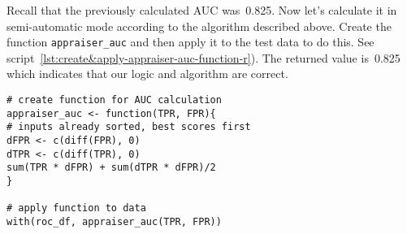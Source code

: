 \documentclass[]{scrreprt}
\begin{document}
Recall that the previously calculated AUC was~0.825. Now let's calculate it in semi-automatic mode according to the algorithm described above. Create the function \texttt{appraiser\_auc} and then apply it to the test data to do this. See script~\ref{lst:create&apply-appraiser-auc-function-r}). The returned value is~0.825 which indicates that our logic and algorithm are correct.
%
\begin{lstlisting}[float=htp, caption = Creating a function to calculate AUC in semi-automatic mode and applying it to test data, firstnumber=1, label= lst:create&apply-appraiser-auc-function-r]
# create function for AUC calculation
appraiser_auc <- function(TPR, FPR){
# inputs already sorted, best scores first 
dFPR <- c(diff(FPR), 0)
dTPR <- c(diff(TPR), 0)
sum(TPR * dFPR) + sum(dTPR * dFPR)/2
}

# apply function to data
with(roc_df, appraiser_auc(TPR, FPR))
\end{lstlisting}
\end{document}
